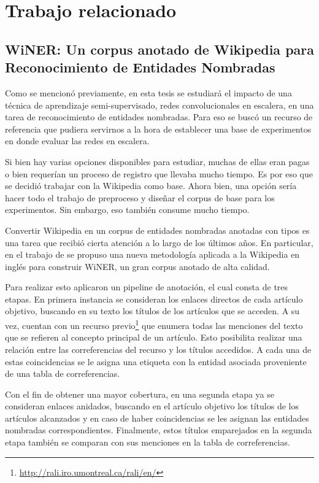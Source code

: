 \chapter{Trabajo relacionado} \label{chapter:chapter2}

\section{WiNER: Un corpus anotado de Wikipedia para Reconocimiento de Entidades Nombradas}

Como se mencionó previamente, en esta tesis se estudiará el impacto de una técnica de aprendizaje semi-supervisado, redes convolucionales en escalera, en una tarea de reconocimiento de entidades nombradas. Para eso se buscó un recurso de referencia que pudiera servirnos a la hora de establecer una base de experimentos en donde evaluar las redes en escalera.

Si bien hay varias opciones disponibles para estudiar, muchas de ellas eran pagas o bien requerían un proceso de registro que llevaba mucho tiempo. Es por eso que se decidió trabajar con la Wikipedia como base. Ahora bien, una opción sería hacer todo el trabajo de preproceso y diseñar el corpus de base para los experimentos. Sin embargo, eso también consume mucho tiempo.
 
Convertir Wikipedia en un corpus de entidades nombradas anotadas con tipos es una tarea que recibió cierta atención a lo largo de los últimos años. En particular, en el trabajo de \cite{WiNER-Ghaddar-Langlais} se propuso una nueva metodología aplicada a la Wikipedia en inglés para construir WiNER, un gran corpus anotado de alta calidad. 

Para realizar esto aplicaron un pipeline de anotación, el cual consta de tres etapas. En primera instancia se consideran los enlaces directos de cada artículo objetivo, buscando en su texto los títulos de los artículos que se acceden. A su vez, cuentan con un recurso previo\footnote{\url{http://rali.iro.umontreal.ca/rali/en/}} que enumera todas las menciones del texto que se refieren al concepto principal de un artículo. Esto posibilita realizar una relación entre las correferencias del recurso y los títulos accedidos. A cada una de estas coincidencias se le asigna una etiqueta con la entidad asociada proveniente de una tabla de correferencias. 

Con el fin de obtener una mayor cobertura, en una segunda etapa ya se consideran enlaces anidados, buscando en el artículo objetivo los títulos de los artículos alcanzados y en caso de haber coincidencias se les asignan las entidades nombradas correspondientes. Finalmente, estos títulos emparejados en la segunda etapa también se comparan con sus menciones en la tabla de correferencias.

